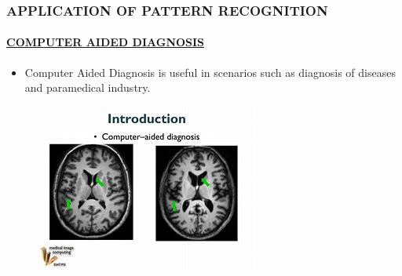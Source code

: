 \documentclass{beamer}
\begin{document}
\begin{frame}

\frametitle{APPLICATION OF PATTERN RECOGNITION}\pause
\framesubtitle{\underline{COMPUTER AIDED DIAGNOSIS }}\pause
 \begin{itemize}
 \item Computer Aided Diagnosis is useful in scenarios such as diagnosis of diseases and paramedical industry.\pause
 \end{itemize}
 

\begin{figure}
\includegraphics[width=.8\textwidth]{cad.jpg}\pause
\end{figure} 
 
 
\end{frame}
\end{document}
